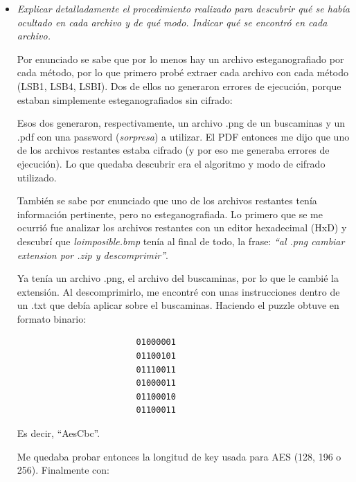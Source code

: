 \documentclass[a4paper,12pt]{article}
\begin{document}
	\begin{itemize}

		\item \textit{Explicar detalladamente el procedimiento realizado para descubrir qué se había ocultado en cada archivo y de qué modo. Indicar qué se encontró en cada archivo.}
	
		Por enunciado se sabe que por lo menos hay un archivo esteganografiado por cada método, por lo que primero probé extraer cada archivo con cada método (LSB1, LSB4, LSBI). Dos de ellos no generaron errores de ejecución, porque estaban simplemente esteganografiados sin cifrado:
		
		
		
		Esos dos generaron, respectivamente, un archivo .png de un buscaminas y un .pdf con una password (\textit{sorpresa}) a utilizar. El PDF entonces me dijo que uno de los archivos restantes estaba cifrado (y por eso me generaba errores de ejecución). Lo que quedaba descubrir era el algoritmo y modo de cifrado utilizado. 
		
		También se sabe por enunciado que uno de los archivos restantes tenía información pertinente, pero no esteganografiada. Lo primero que se me ocurrió fue analizar los archivos restantes con un editor hexadecimal (HxD) y descubrí que \textit{loimposible.bmp} tenía al final de todo, la frase: \textit{``al .png cambiar extension por .zip y descomprimir''}.
		
		Ya tenía un archivo .png, el archivo del buscaminas, por lo que le cambié la extensión. Al descomprimirlo, me encontré con unas instrucciones dentro de un .txt que debía aplicar sobre el buscaminas. Haciendo el puzzle obtuve en formato binario:
		
		\begin{center}
				\begin{varwidth}{\linewidth}
					\begin{verbatim}
						01000001
						01100101
						01110011
						01000011
						01100010
						01100011
					\end{verbatim}
				\end{varwidth}
		\end{center}
	
		Es decir, ``AesCbc''.
		
		Me quedaba probar entonces la longitud de key usada para AES (128, 196 o 256). Finalmente con:
		

\end{itemize}
\end{document}
